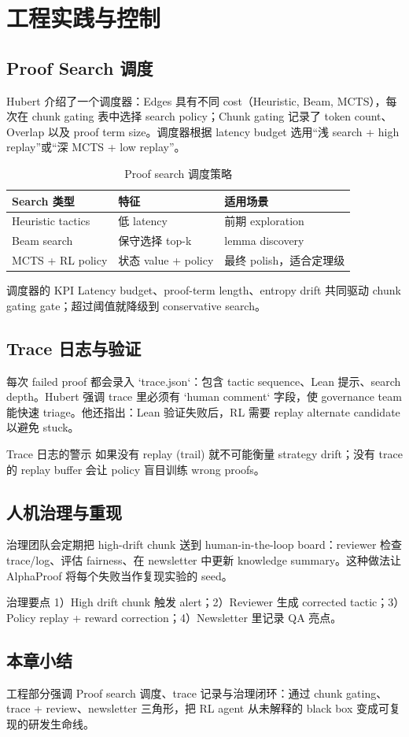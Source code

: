 \section{工程实践与控制}

\subsection{Proof Search 调度}
Hubert 介绍了一个调度器：Edges 具有不同 cost（Heuristic, Beam, MCTS），每次在 chunk gating 表中选择 search policy；Chunk gating 记录了 token count、Overlap 以及 proof term size。调度器根据 latency budget 选用“浅 search + high replay”或“深 MCTS + low replay”。
\begin{table}[H]
\centering
\begin{tabular}{p{4cm}p{4cm}p{4cm}}
\toprule
Search 类型 & 特征 & 适用场景 \\
\midrule
Heuristic tactics & 低 latency & 前期 exploration \\
Beam search & 保守选择 top-k & lemma discovery \\
MCTS + RL policy & 状态 value + policy & 最终 polish，适合定理级 \\
\bottomrule
\end{tabular}
\caption{Proof search 调度策略}
\end{table}
\begin{importantbox}{调度器的 KPI}
Latency budget、proof-term length、entropy drift 共同驱动 chunk gating gate；超过阈值就降级到 conservative search。
\end{importantbox}

\subsection{Trace 日志与验证}
每次 failed proof 都会录入 `trace.json`：包含 tactic sequence、Lean 提示、search depth。Hubert 强调 trace 里必须有 `human comment` 字段，使 governance team 能快速 triage。他还指出：Lean 验证失败后，RL 需要 replay alternate candidate 以避免 stuck。
\begin{warningbox}{Trace 日志的警示}
如果没有 replay (trail) 就不可能衡量 strategy drift；没有 trace 的 replay buffer 会让 policy 盲目训练 wrong proofs。
\end{warningbox}

\subsection{人机治理与重现}
治理团队会定期把 high-drift chunk 送到 human-in-the-loop board：reviewer 检查 trace/log、评估 fairness、在 newsletter 中更新 knowledge summary。这种做法让 AlphaProof 将每个失败当作复现实验的 seed。
\begin{knowledgebox}{治理要点}
1）High drift chunk 触发 alert；2）Reviewer 生成 corrected tactic；3）Policy replay + reward correction；4）Newsletter 里记录 QA 亮点。
\end{knowledgebox}

\subsection{本章小结}
工程部分强调 Proof search 调度、trace 记录与治理闭环：通过 chunk gating、trace + review、newsletter 三角形，把 RL agent 从未解释的 black box 变成可复现的研发生命线。
\newpage

